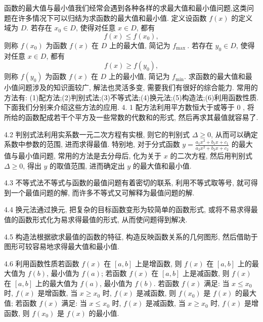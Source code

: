 
函数的最大值与最小值我们经常会遇到各种各样的求最大值和最小值问题,这类问题在许多情况下可以归结为求函数的最大值和最小值.
定义设函数 $f(x)$ 的定义域为 $D$. 若存在 $x_0 \in D$, 使得对任意 $x \in D$, 都有
$$
f(x) \leqslant f\left(x_0\right),
$$
则称 $f\left(x_0\right)$ 为函数 $f(x)$ 在 $D$ 上的最大值, 简记为 $f_{\text {max }}$. 若存在 $y_0 \in D$, 使得对任意 $x \in D$, 都有
$$
f(x) \geqslant f\left(y_0\right),
$$
则称 $f\left(y_0\right)$ 为函数 $f(x)$ 在 $D$ 上的最小值, 简记为 $f_{\min }$.
求函数的最大值和最小值问题涉及的知识面较广, 解法也灵活多变, 需要我们有很好的综合能力.
常用的方法有:
(1)配方法;(2)判别式法;(3)不等式法;(4)换元法;(5)构造法;(6)利用函数性质.
下面我们分别来介绍这些方法的应用.
4. 1 配方法利用平方数恒大于或等于 0 , 将所给的函数配成若干个平方及一些常数的代数和的形式, 然后再求其最值就容易了.



4.2 判别式法利用实系数一元二次方程有实根, 则它的判别式 $\Delta \geqslant 0$, 从而可以确定系数中参数的范围, 进而求得最值.
特别地, 对于分式函数 $y=\frac{a_1 x^2+b_1 x+c_1}{a_2 x^2+b_2 x+c_2}$ 的最大值与最小值问题, 常用的方法是去分母后, 化为关于 $x$ 的二次方程, 然后用判别式 $\Delta \geqslant 0$, 得出 $y$ 的取值范围, 进而确定出 $y$ 的最大值和最小值.



4.3 不等式法不等式与函数的最值问题有着密切的联系, 利用不等式取等号, 就可得到一个最值问题的解, 而许多不等式又可解释为最值问题的解.



4.4 换元法通过换元, 把复杂的目标函数变形为较简单的函数形式, 或将不易求得最值的函数形式化为易求得最值的形式, 从而使问题得到解决.



4.5 构造法根据欲求最值的函数的特征, 构造反映函数关系的几何图形, 然后借助于图形可较容易地求得最大值和最小值.



4.6 利用函数性质若函数 $f(x)$ 在 $[a, b]$ 上是增函数, 则 $f(x)$ 在 $[a, b]$ 上的最大值为 $f(b)$, 最小值为 $f(a)$; 若函数 $f(x)$ 在 $[a, b]$ 上是减函数, 则 $f(x)$ 在 $[a, b]$ 上的最大值为 $f(a)$, 最小值为 $f(b)$.
若函数 $f(x)$ 满足: 当 $x \leqslant x_0$ 时, $f(x)$ 是增函数, 当 $x \geqslant x_0$ 时, $f(x)$ 是减函数, 则 $f\left(x_0\right)$ 是 $f(x)$ 的最大值;
若函数 $f(x)$ 满足: 当 $x \leqslant x_0$ 时, $f(x)$ 是减函数, 当 $x \geqslant x_0$ 时, $f(x)$ 是增函数, 则 $f\left(x_0\right)$ 是 $f(x)$ 的最小值.



